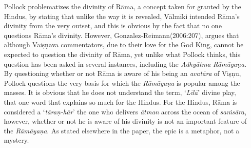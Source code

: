 Pollock problematizes the divinity of Rāma, a concept taken for granted by the Hindus, by stating that unlike the way it is revealed, Vālmīki intended Rāma’s divinity from the very outset, and this is obvious by the fact that no one questions Rāma’s divinity. However, Gonzalez-Reimann(2006:207), argues that although Vaiṣṇava commentators, due to their love for the God King, cannot be expected to question the divinity of Rāma, yet unlike what Pollock thinks, this question has been asked in several instances, including the \textit{Adhyātma Rāmāyaṇa}. By questioning whether or not Rāma is aware of his being an \textit{avatāra} of Viṣṇu, Pollock questions the very basis for which the \textit{Rāmāyaṇa} is popular among the masses. It is obvious that he does not understand the term, ‘\textit{Līlā}’ divine play, that one word that explains so much for the Hindus. For the Hindus, Rāma is considered a ‘\textit{tāraṇ-hār}’ the one who delivers \textit{ātman} across the ocean of \textit{saṁsāra}, however, whether or not he is aware of his divinity is not an important feature of the \textit{Rāmāyaṇa}. As stated elsewhere in the paper, the epic is a metaphor, not a mystery.

